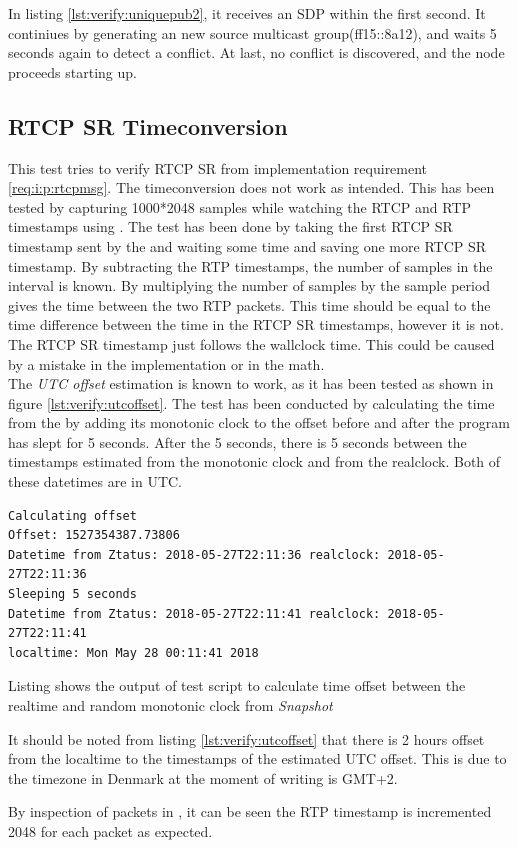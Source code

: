In listing \ref{lst:verify:uniquepub2}, it receives an SDP within the first second. It continiues by generating an new source multicast group(ff15::8a12), and waits 5 seconds again to detect a conflict. At last, no conflict is discovered, and the node proceeds starting up.


\subsection{RTCP SR Timeconversion}\label{sec:verify:rtcpsr}
This test tries to verify RTCP SR from implementation requirement \ref{req:i:p:rtcpmsg}. The timeconversion does not work as intended. This has been tested by capturing 1000*2048 samples while watching the RTCP and RTP timestamps using .  The test has been done by taking the first RTCP SR timestamp sent by the \pub{} and waiting some time and saving one more RTCP SR timestamp. By subtracting the RTP timestamps, the number of samples in the interval is known. By multiplying the number of samples by the sample period gives the time between the two RTP packets. This time should be equal to the time difference between the time in the RTCP SR timestamps, however it is not. The RTCP SR timestamp just follows the wallclock time. This could be caused by a mistake in the implementation or in the math.\\

\noindent{}The \textit{UTC offset} estimation is known to work, as it has been tested as shown in figure \ref{lst:verify:utcoffset}. The test has been conducted by calculating the time from the  by adding its monotonic clock to the offset before and after the program has slept for 5 seconds. After the 5 seconds, there is 5 seconds between the timestamps estimated from the monotonic clock and from the realclock.  Both of these datetimes are in UTC.

\begin{listing}[H] 
\begin{verbatim}
Calculating offset
Offset: 1527354387.73806
Datetime from Ztatus: 2018-05-27T22:11:36 realclock: 2018-05-27T22:11:36
Sleeping 5 seconds
Datetime from Ztatus: 2018-05-27T22:11:41 realclock: 2018-05-27T22:11:41
localtime: Mon May 28 00:11:41 2018
\end{verbatim}
\caption{Listing shows the output of test script to calculate time offset between the realtime and random monotonic clock from \textit{Snapshot}}
\label{lst:verify:utcoffset}
\end{listing}

It should be noted from listing \ref{lst:verify:utcoffset} that there is 2 hours offset from the localtime to the timestamps of the estimated UTC offset.  This is due to the timezone in Denmark at the moment of writing is GMT+2.

\noindent{}By inspection of packets in , it can be seen the RTP timestamp is incremented 2048 for each packet as expected.


